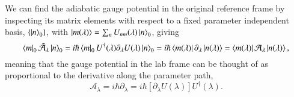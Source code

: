 We can find the adiabatic gauge potential in the original reference frame by inspecting its matrix elements with respect to a fixed parameter independent basis, $\{\ket{n}_0\}$, with $\ket{m (\lambda)} = \sum_n U_{nm}(\lambda)\ket{n}_0$, giving~\cite{kolodrubetz2017geometry}
\begin{equation}
    \bra{m}_0 \tilde{\mathcal{A}}_\lambda \ket{n}_0 = i \hbar \bra{m}_0 U^\dagger(\lambda) \partial_\lambda U(\lambda) \ket{n}_0= i \hbar  \bra{m (\lambda)} \partial_\lambda \ket{n (\lambda)} =  \bra{m (\lambda)} \mathcal{A}_\lambda \ket{n (\lambda)},
\end{equation}
meaning that the gauge potential in the lab frame can be thought of as proportional to the derivative along the parameter path,
\begin{equation}
\label{eq:Alambda}
    \mathcal{A}_\lambda = i \hbar \partial_\lambda =  i \hbar [\partial_\lambda U(\lambda) ]U^\dagger(\lambda).
\end{equation}


